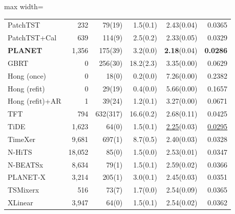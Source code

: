 \begin{table}[!t]
\begin{adjustbox}{max width=\linewidth}
\begin{tabular}{lrrrrr}
PatchTST & 232 & 79{\scriptsize\color{gray}(19)} & 1.5{\scriptsize\color{gray}(0.1)} & 2.43{\scriptsize\color{gray}(0.04)} & 0.0365 \\
PatchTST+Cal & 639 & 114{\scriptsize\color{gray}(9)} & 2.5{\scriptsize\color{gray}(0.2)} & 2.33{\scriptsize\color{gray}(0.05)} & 0.0329 \\
\textbf{PLANET} & 1{,}356 & 175{\scriptsize\color{gray}(39)} & 3.2{\scriptsize\color{gray}(0.0)} & \textbf{2.18}{\scriptsize\color{gray}(0.04)} & \textbf{0.0286} \\
GBRT & 0 & 256{\scriptsize\color{gray}(30)} & 18.2{\scriptsize\color{gray}(2.3)} & 3.35{\scriptsize\color{gray}(0.00)} & 0.0629 \\
Hong (once) & 0 & 18{\scriptsize\color{gray}(0)} & 0.2{\scriptsize\color{gray}(0.0)} & 7.26{\scriptsize\color{gray}(0.00)} & 0.2382 \\
Hong (refit) & 0 & 29{\scriptsize\color{gray}(19)} & 0.4{\scriptsize\color{gray}(0.0)} & 5.66{\scriptsize\color{gray}(0.00)} & 0.1657 \\
Hong (refit)+AR & 1 & 39{\scriptsize\color{gray}(24)} & 1.2{\scriptsize\color{gray}(0.1)} & 3.27{\scriptsize\color{gray}(0.00)} & 0.0671 \\
TFT & 794 & 632{\scriptsize\color{gray}(317)} & 16.6{\scriptsize\color{gray}(0.2)} & 2.68{\scriptsize\color{gray}(0.11)} & 0.0425 \\
TiDE & 1{,}623 & 64{\scriptsize\color{gray}(0)} & 1.5{\scriptsize\color{gray}(0.1)} & \underline{2.25}{\scriptsize\color{gray}(0.03)} & \underline{0.0295} \\
TimeXer & 9{,}681 & 697{\scriptsize\color{gray}(1)} & 8.7{\scriptsize\color{gray}(0.5)} & 2.40{\scriptsize\color{gray}(0.03)} & 0.0328 \\
N-HiTS & 18{,}052 & 85{\scriptsize\color{gray}(0)} & 1.5{\scriptsize\color{gray}(0.0)} & 2.53{\scriptsize\color{gray}(0.01)} & 0.0347 \\
N-BEATSx & 8{,}634 & 79{\scriptsize\color{gray}(1)} & 1.5{\scriptsize\color{gray}(0.1)} & 2.59{\scriptsize\color{gray}(0.02)} & 0.0366 \\
PLANET-X & 3{,}214 & 205{\scriptsize\color{gray}(1)} & 3.0{\scriptsize\color{gray}(0.1)} & 2.45{\scriptsize\color{gray}(0.03)} & 0.0351 \\
TSMixerx & 516 & 73{\scriptsize\color{gray}(7)} & 1.7{\scriptsize\color{gray}(0.0)} & 2.54{\scriptsize\color{gray}(0.09)} & 0.0365 \\
XLinear & 3{,}947 & 64{\scriptsize\color{gray}(0)} & 1.5{\scriptsize\color{gray}(0.1)} & 2.54{\scriptsize\color{gray}(0.02)} & 0.0362 \\
\bottomrule
\end{tabular}
\end{adjustbox}
\end{table}
